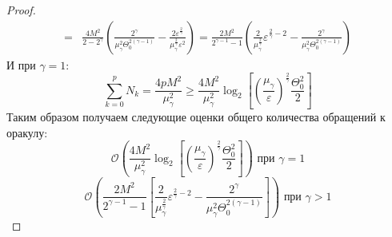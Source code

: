 \begin{proof}
\[\begin{aligned}
           =& \frac{4 M^2 }{2 - 2^{\gamma}}\left( \frac{2^{\gamma}}{\mu_{\gamma}^2 \Theta_0^{2(\gamma - 1)}} - \frac{2 \varepsilon^{\frac{2}{\gamma}}}{\mu_{\gamma}^{\frac{2}{\gamma}} \varepsilon^2} \right) = \frac{2 M^2 }{2^{\gamma - 1} - 1}\left( \frac{2}{\mu_{\gamma}^{\frac{2}{\gamma}}}\varepsilon^{\frac{2}{\gamma} - 2} - \frac{2^{\gamma}}{\mu_{\gamma}^2 \Theta_0^{2(\gamma - 1)}} \right)
       \end{aligned}
       \]
       И при $\gamma = 1$:
       \[
           \sum_{k=0}^{p} N_k = \frac{4 p M^2}{\mu_{\gamma}^2} \geq \frac{4 M^2}{\mu_{\gamma}^2} \log_2{\left[\left(\frac{\mu_{\gamma}}{\varepsilon}\right)^{\frac{2}{\gamma}} \frac{\Theta_0^2}{2}\right]}
       \]
       Таким образом получаем следующие оценки общего количества обращений к оракулу:
       \[
           \mathcal{O} \left( \frac{4 M^2}{\mu_{\gamma}^2} \log_2{\left[\left(\frac{\mu_{\gamma}}{\varepsilon}\right)^{\frac{2}{\gamma}} \frac{\Theta_0^2}{2}\right]}\right) \text{ при } \gamma = 1
       \]
       \[
           \mathcal{O} \left( \frac{2 M^2 }{2^{\gamma - 1} - 1}\left[ \frac{2}{\mu_{\gamma}^{\frac{2}{\gamma}}}\varepsilon^{\frac{2}{\gamma} - 2} - \frac{2^{\gamma}}{\mu_{\gamma}^2 \Theta_0^{2(\gamma - 1)}} \right] \right) \text{ при } \gamma > 1
       \]
       

\end{proof}
